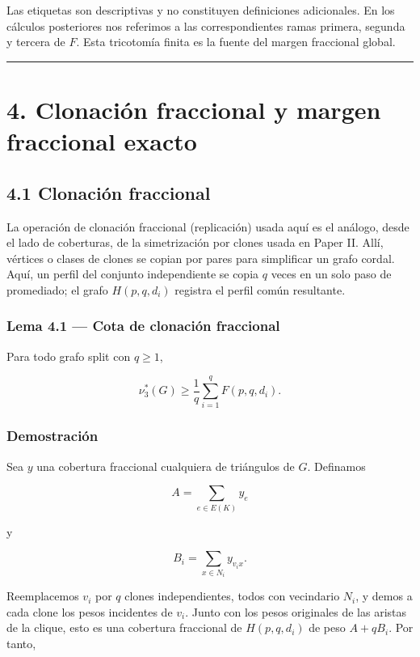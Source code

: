 \documentclass[
  11pt,
]{article}
\begin{document}
Las etiquetas son descriptivas y no constituyen definiciones
adicionales. En los cálculos posteriores nos referimos a las
correspondientes ramas primera, segunda y tercera de \(F\). Esta
tricotomía finita es la fuente del margen fraccional global.

\begin{center}\rule{0.5\linewidth}{0.5pt}\end{center}

\section{4. Clonación fraccional y margen fraccional
exacto}\label{clonaciuxf3n-fraccional-y-margen-fraccional-exacto}

\subsection{4.1 Clonación fraccional}\label{clonaciuxf3n-fraccional}

La operación de clonación fraccional (replicación) usada aquí es el
análogo, desde el lado de coberturas, de la simetrización por clones
usada en Paper II. Allí, vértices o clases de clones se copian por pares
para simplificar un grafo cordal. Aquí, un perfil del conjunto
independiente se copia \(q\) veces en un solo paso de promediado; el
grafo \(H(p,q,d_i)\) registra el perfil común resultante.

\subsubsection{Lema 4.1 --- Cota de clonación
fraccional}\label{lema-4.1-cota-de-clonaciuxf3n-fraccional}

Para todo grafo split con \(q\ge1\),

\[
\boxed{
\nu_3^*(G)
\ge
\frac1q\sum_{i=1}^qF(p,q,d_i).
}
\tag{4.1}
\]

\subsubsection{Demostración}\label{demostraciuxf3n-1}

Sea \(y\) una cobertura fraccional cualquiera de triángulos de \(G\).
Definamos

\[
A=\sum_{e\in E(K)}y_e
\]

y

\[
B_i=\sum_{x\in N_i}y_{v_ix}.
\]

Reemplacemos \(v_i\) por \(q\) clones independientes, todos con
vecindario \(N_i\), y demos a cada clone los pesos incidentes de
\(v_i\). Junto con los pesos originales de las aristas de la clique,
esto es una cobertura fraccional de \(H(p,q,d_i)\) de peso \(A+qB_i\).
Por tanto,
\end{document}
